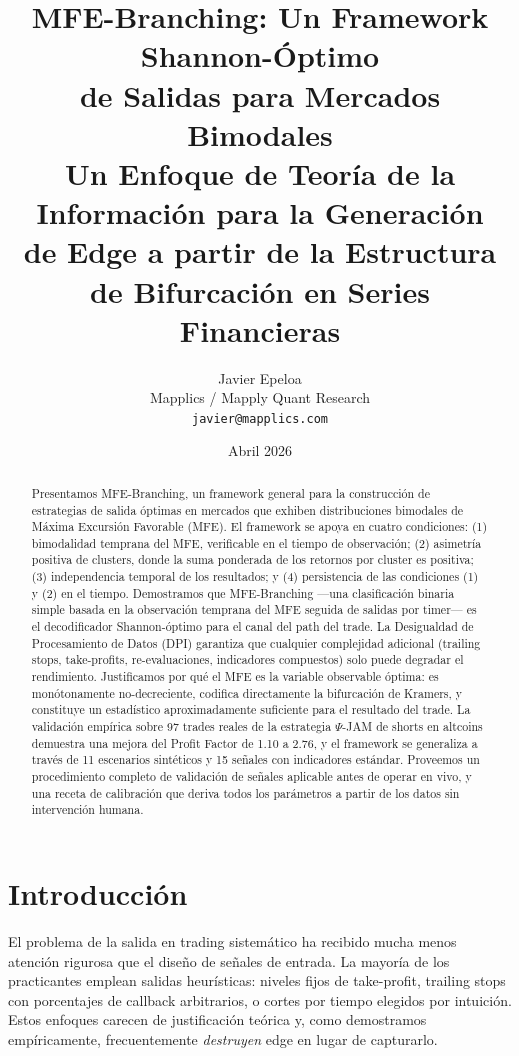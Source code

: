 \documentclass[11pt,a4paper]{article}
\title{\textbf{MFE-Branching: Un Framework Shannon-Óptimo\\de Salidas para Mercados Bimodales}\\\vspace{0.5cm}\large Un Enfoque de Teoría de la Información para la Generación\\de Edge a partir de la Estructura de Bifurcación en Series Financieras}
\author{Javier Epeloa\\\small Mapplics / Mapply Quant Research\\\small\texttt{javier@mapplics.com}}
\date{Abril 2026}
\begin{document}
\maketitle

\begin{abstract}
Presentamos MFE-Branching, un framework general para la construcción de estrategias de salida óptimas en mercados que exhiben distribuciones bimodales de Máxima Excursión Favorable (MFE). El framework se apoya en cuatro condiciones: (1) bimodalidad temprana del MFE, verificable en el tiempo de observación; (2) asimetría positiva de clusters, donde la suma ponderada de los retornos por cluster es positiva; (3) independencia temporal de los resultados; y (4) persistencia de las condiciones (1) y (2) en el tiempo. Demostramos que MFE-Branching ---una clasificación binaria simple basada en la observación temprana del MFE seguida de salidas por timer--- es el decodificador Shannon-óptimo para el canal del path del trade. La Desigualdad de Procesamiento de Datos (DPI) garantiza que cualquier complejidad adicional (trailing stops, take-profits, re-evaluaciones, indicadores compuestos) solo puede degradar el rendimiento. Justificamos por qué el MFE es la variable observable óptima: es monótonamente no-decreciente, codifica directamente la bifurcación de Kramers, y constituye un estadístico aproximadamente suficiente para el resultado del trade. La validación empírica sobre 97 trades reales de la estrategia $\Psi$-JAM de shorts en altcoins demuestra una mejora del Profit Factor de 1.10 a 2.76, y el framework se generaliza a través de 11 escenarios sintéticos y 15 señales con indicadores estándar. Proveemos un procedimiento completo de validación de señales aplicable antes de operar en vivo, y una receta de calibración que deriva todos los parámetros a partir de los datos sin intervención humana.
\end{abstract}

\tableofcontents
\newpage

\section{Introducción}

El problema de la salida en trading sistemático ha recibido mucha menos atención rigurosa que el diseño de señales de entrada. La mayoría de los practicantes emplean salidas heurísticas: niveles fijos de take-profit, trailing stops con porcentajes de callback arbitrarios, o cortes por tiempo elegidos por intuición. Estos enfoques carecen de justificación teórica y, como demostramos empíricamente, frecuentemente \emph{destruyen} edge en lugar de capturarlo.
\end{document}
